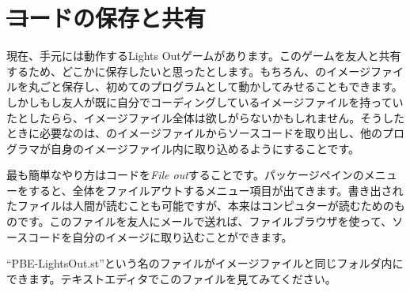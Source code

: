 \documentclass[a4paper,10pt,twoside]{book}
\begin{document}

\section{\st コードの保存と共有}

現在、手元には動作するLights Outゲームがあります。このゲームを友人と共有するため、どこかに保存したいと思ったとします。もちろん、\pharo のイメージファイルを丸ごと保存し、初めてのプログラムとして動かしてみせることもできます。しかしもし友人が既に自分でコーディングしているイメージファイルを持っていたとしたらら、イメージファイル全体は欲しがらないかもしれません。そうしたときに必要なのは、\pharo のイメージファイルからソースコードを取り出し、他のプログラマが自身のイメージファイル内に取り込めるようにすることです。

最も簡単なやり方はコードを\emph{File out}することです。パッケージペインのメニューを\actclick すると、全体をファイルアウトするメニュー項目が出てきます。書き出されたファイルは人間が読むことも可能ですが、本来はコンピュターが読むためのものです。このファイルを友人にメールで送れば、ファイルブラウザを使って、ソースコードを自分の\pharo イメージに取り込むことができます。


``PBE-LightsOut.st''という名のファイルがイメージファイルと同じフォルダ内にできます。テキストエディタでこのファイルを見てみてください。

\end{document}
